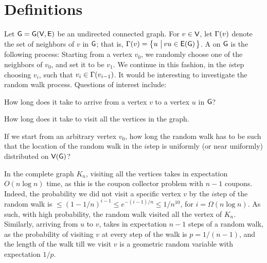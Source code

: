 
%





\ChapterPrefix{}
\ChapterGen{}



\section{Definitions}

Let $\mathsf{G}= \mathsf{G}(\mathsf{V}, \mathsf{E})$ be an undirected connected
graph. For $v \in \mathsf{V}$, let $\Gamma(v)$ denote the set of
neighbors of $v$ in $\mathsf{G}$; that is, $\Gamma(v) = \left\{ {u \,\left|\, {vu \in
      \mathsf{E}(\mathsf{G})} \bigr.\right.} \right\}$. A  on $\mathsf{G}$ is the
following process: Starting from a vertex $v_0$, we randomly choose
one of the neighbors of $v_0$, and set it to be $v_1$. We continue in
this fashion, in the $i$\th step choosing $v_i$, such that $v_i \in
\Gamma(v_{i-1})$. It would be interesting to investigate the random walk
process. Questions of interest include:
\begin{compactenumA}
    \item How long does it take to arrive from a vertex $v$ to a
    vertex $u$ in $\mathsf{G}$?
    \item How long does it take to visit all the vertices in the
    graph.
    \item If we start from an arbitrary vertex $v_0$, how long the
    random walk has to be such that the location of the random walk in
    the $i$\th step is uniformly (or near uniformly) distributed on
    $\mathsf{V}(\mathsf{G})$?
\end{compactenumA}


\begin{example}
    In the complete graph $K_n$, visiting all the vertices takes in
    expectation $O(n \log n)$ time, as this is the coupon collector
    problem with $n-1$ coupons. Indeed, the probability we did not
    visit a specific vertex $v$ by the $i$\th step of the random walk
    is $\leq (1-1/n)^{i-1} \leq e^{- (i-1)/n} \leq 1/n^{10}$, for $i =
    \Omega( n \log n)$. As such, with high probability, the random
    walk visited all the vertex of $K_n$.  Similarly, arriving from
    $u$ to $v$, takes in expectation $n-1$ steps of a random walk, as
    the probability of visiting $v$ at every step of the walk is $p =
    1/(n-1)$, and the length of the walk till we visit $v$ is a
    geometric random variable with expectation $1/p$.
\end{example}

